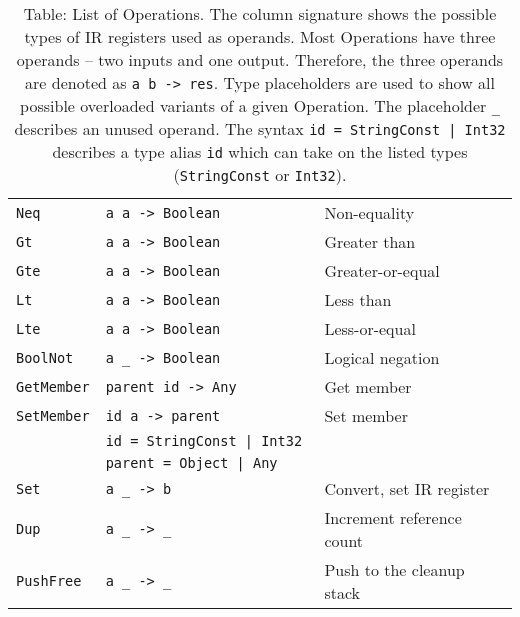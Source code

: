 \begin{table}
\begin{tabular}{l | l | l}
        \texttt{Neq}         & \texttt{a      a     -> Boolean  } &  Non-equality               \\
        \texttt{Gt}          & \texttt{a      a     -> Boolean  } &  Greater than               \\
        \texttt{Gte}         & \texttt{a      a     -> Boolean  } &  Greater-or-equal           \\
        \texttt{Lt}          & \texttt{a      a     -> Boolean  } &  Less than                  \\
        \texttt{Lte}         & \texttt{a      a     -> Boolean  } &  Less-or-equal              \\
        \texttt{BoolNot}     & \texttt{a      \_    -> Boolean  } &  Logical negation           \\\hline
        \texttt{GetMember}   & \texttt{parent id    -> Any      } &  Get member                 \\
        \texttt{SetMember}   & \texttt{id     a     -> parent   } &  Set member                 \\
                             & \texttt{id = StringConst | Int32 } &                             \\
                             & \texttt{parent = Object | Any    } &                             \\\hline
        \texttt{Set}         & \texttt{a      \_    -> b        } &  Convert, set IR register   \\
        \texttt{Dup}         & \texttt{a      \_    -> \_       } &  Increment reference count  \\
        \texttt{PushFree}    & \texttt{a      \_    -> \_       } &  Push to the cleanup stack  \\
    \end{tabular}
    \caption{Table: List of Operations. The column signature shows the possible types of IR registers used as operands. Most Operations have three operands -- two inputs and one output. Therefore, the three operands are denoted as \texttt{a b -> res}. Type placeholders are used to show all possible overloaded variants of a given Operation. The placeholder \texttt{\_} describes an unused operand. The syntax \texttt{id = StringConst | Int32} describes a type alias \texttt{id} which can take on the listed types (\texttt{StringConst} or \texttt{Int32}). }
    \label{tab:opcodes}
\end{table}


